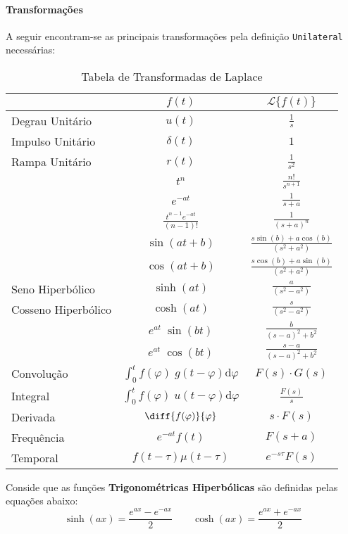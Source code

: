 \documentclass{article}
\begin{document}
    \paragraph{Transformações}A seguir encontram-se as principais transformações pela definição \texttt{Unilateral} necessárias:
    \begin{table}[H]
        \centering\begingroup
        \renewcommand{\arraystretch}{1.25}
        \begin{tabular}[]{lcc}
                                & $f(t)$      & $\mathcal{L}\{ f(t) \}$\\\hline
            Degrau Unitário     & $u(t)$      & $\frac{1}{s}$\\
            Impulso Unitário    & $\delta(t)$ & $1$\\
            Rampa Unitário      & $r(t)$      & $\frac{1}{s^2}$\\
                                & $t^{n}$     & $\frac{n!}{s^{n+1}}$\\
                                & $e^{-at}$   & $\frac{1}{s+a}$\\
                                & $\frac{t^{n-1}e^{-at}}{(n-1)!}$  & $\frac{1}{(s+a)^{n}}$\\
                                & $\sin(at + b)$  & $\frac{s\sin(b) + a\cos(b)}{(s^2+a^2)}$\\
                                & $\cos(at + b)$  & $\frac{s\cos(b) + a\sin(b)}{(s^2+a^2)}$\\
            Seno Hiperbólico    & $\sinh(at)$  & $\frac{a}{(s^2-a^2)}$\\
            Cosseno Hiperbólico & $\cosh(at)$  & $\frac{s}{(s^2-a^2)}$\\
                                & $e^{at}\;\sin(bt)$  & $\frac{b}{(s-a)^2+b^2}$\\
                                & $e^{at}\;\cos(bt)$  & $\frac{s-a}{(s-a)^2+b^2}$\\
            Convolução          & $\int_{0}^{t} f(\varphi)\;g(t - \varphi) \text{d}\varphi$ & $F(s)\cdot G(s)$\\
            Integral            & $\int_{0}^{t} f(\varphi)\;u(t - \varphi) \text{d}\varphi$ & $\frac{F(s)}{s}$\\
            Derivada         & $\diff{f(\varphi)}{\varphi}$ & $s\cdot F(s)$\\
            Frequência       & $e^{-at}f(t)$          & $F(s+a)$\\
            Temporal         & $f(t-\tau)\mu(t-\tau)$ & $e^{-s\tau}F(s)$\\\hline
        \end{tabular}
        \endgroup
        \caption{Tabela de Transformadas de Laplace}\label{table:Laplace}
    \end{table} \noindent
    Conside que as funções \textbf{Trigonométricas Hiperbólicas} são definidas pelas equações abaixo:
    \begin{equation}
        \boxed{
            \sinh(ax) = \frac{e^{ax} - e^{-ax}}{2}
        }
        \qquad
        \boxed{
            \cosh(ax) = \frac{e^{ax} + e^{-ax}}{2}
        }
    \end{equation}
\end{document}
